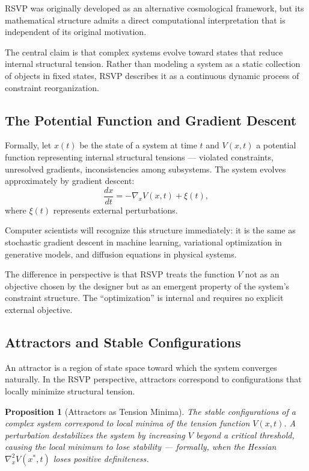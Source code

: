 \documentclass[11pt, a4paper]{article}
\theoremstyle{named}
\newtheorem{proposition}{Proposition}
\begin{document}
RSVP was originally developed as an alternative cosmological
framework, but its mathematical structure admits a direct
computational interpretation that is independent of its original
motivation.

The central claim is that complex systems evolve toward states that
reduce internal structural tension. Rather than modeling a system as
a static collection of objects in fixed states, RSVP describes it as
a continuous dynamic process of constraint reorganization.

\subsection{The Potential Function and Gradient Descent}

Formally, let $x(t)$ be the state of a system at time $t$ and
$V(x,t)$ a potential function representing internal structural
tensions --- violated constraints, unresolved gradients,
inconsistencies among subsystems. The system evolves approximately
by gradient descent:
\[
  \frac{dx}{dt} = -\nabla_x V(x,t) + \xi(t),
\]
where $\xi(t)$ represents external perturbations.

Computer scientists will recognize this structure immediately: it is
the same as stochastic gradient descent in machine learning,
variational optimization in generative models, and diffusion equations
in physical systems.

The difference in perspective is that RSVP treats the function $V$
not as an objective chosen by the designer but as an emergent property
of the system's constraint structure. The ``optimization'' is internal
and requires no explicit external objective.

\subsection{Attractors and Stable Configurations}

An attractor is a region of state space toward which the system
converges naturally. In the RSVP perspective, attractors correspond
to configurations that locally minimize structural tension.

\begin{proposition}[Attractors as Tension Minima]
The stable configurations of a complex system correspond to local
minima of the tension function $V(x,t)$. A perturbation destabilizes
the system by increasing $V$ beyond a critical threshold, causing the
local minimum to lose stability --- formally, when the Hessian
$\nabla_x^2 V(x^*,t)$ loses positive definiteness.
\end{proposition}
\end{document}
